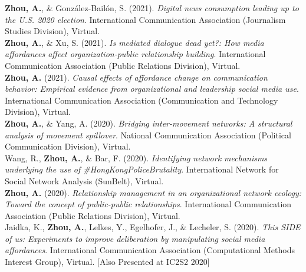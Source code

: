\documentclass[12pt, letterpaper]{article}
\newcommand{\years}[1]{\marginnote{\normalsize #1}}
\begin{document}
{%
\years{[15]} \textbf{Zhou, A.}, \& González-Bailón, S. (2021). \textit{Digital news consumption leading up to the U.S. 2020 election}. International Communication Association (Journalism Studies Division), Virtual.\\
\years{[14]} \textbf{Zhou, A.}, \& Xu, S. (2021). \textit{Is mediated dialogue dead yet?: How media affordances affect organization-public relationship building}. International Communication Association (Public Relations Division), Virtual.\\
\years{[13]} \textbf{Zhou, A.} (2021). \textit{Causal effects of affordance change on communication behavior: Empirical evidence from organizational and leadership social media use}. International Communication Association (Communication and Technology Division), Virtual.\\
\years{[12]} \textbf{Zhou, A.}, \& Yang, A. (2020). \textit{Bridging inter-movement networks: A structural analysis of movement spillover}. National Communication Association (Political Communication Division), Virtual.\\
\years{[11]} Wang, R., \textbf{Zhou, A.}, \& Bar, F. (2020). \textit{Identifying network mechanisms underlying the use of \#HongKongPoliceBrutality}. International Network for Social Network Analysis (SunBelt), Virtual.\\
\years{[10]} \textbf{Zhou, A.} (2020). \textit{Relationship management in an organizational network ecology: Toward the concept of public-public relationships}. International Communication Association (Public Relations Division), Virtual.\\
\years{[9]} Jaidka, K., \textbf{Zhou, A.}, Lelkes, Y., Egelhofer, J., \& Lecheler, S. (2020). \textit{This SIDE of us: Experiments to improve deliberation by manipulating social media affordances}. International Communication Association (Computational Methods Interest Group), Virtual. [Also Presented at IC2S2 2020]\\
}
\end{document}
